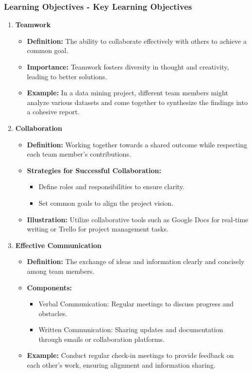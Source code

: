 \documentclass{beamer}
\begin{document}
\begin{frame}[fragile]
    \frametitle{Learning Objectives - Key Learning Objectives}
    \begin{enumerate}
        \item \textbf{Teamwork}
        \begin{itemize}
            \item \textbf{Definition:} The ability to collaborate effectively with others to achieve a common goal.
            \item \textbf{Importance:} Teamwork fosters diversity in thought and creativity, leading to better solutions.
            \item \textbf{Example:} In a data mining project, different team members might analyze various datasets and come together to synthesize the findings into a cohesive report.
        \end{itemize}
        
        \item \textbf{Collaboration}
        \begin{itemize}
            \item \textbf{Definition:} Working together towards a shared outcome while respecting each team member's contributions.
            \item \textbf{Strategies for Successful Collaboration:}
            \begin{itemize}
                \item Define roles and responsibilities to ensure clarity.
                \item Set common goals to align the project vision.
            \end{itemize}
            \item \textbf{Illustration:} Utilize collaborative tools such as Google Docs for real-time writing or Trello for project management tasks.
        \end{itemize}
        
        \item \textbf{Effective Communication}
        \begin{itemize}
            \item \textbf{Definition:} The exchange of ideas and information clearly and concisely among team members.
            \item \textbf{Components:}
            \begin{itemize}
                \item Verbal Communication: Regular meetings to discuss progress and obstacles.
                \item Written Communication: Sharing updates and documentation through emails or collaboration platforms.
            \end{itemize}
            \item \textbf{Example:} Conduct regular check-in meetings to provide feedback on each other's work, ensuring alignment and information sharing.
        \end{itemize}
    \end{enumerate}
\end{frame}
\end{document}
